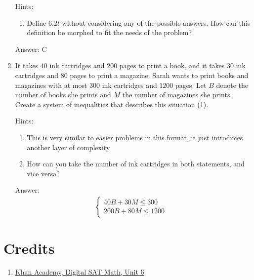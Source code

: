 \documentclass{article}
\begin{document}
\begin{enumerate}
{	      Hints:
	      \begin{enumerate}
		      \item{Define $6.2t$ without considering any of the possible answers. How can this definition be morphed to fit the needs of the problem?}
	      \end{enumerate}

	      Answer: C
	      }

	\item{It takes $40$ ink cartridges and $200$ pages to print a book, and it takes $30$ ink cartridges and $80$ pages to print a magazine. Sarah wants to print books and magazines with at most $300$ ink cartridges and $1200$ pages. Let $B$ denote the number of books she prints and $M$ the number of magazines she prints. Create a system of inequalities that describes this situation (1).

	      Hints:
	      \begin{enumerate}
		      \item{This is very similar to easier problems in this format, it just introduces another layer of complexity}
		      \item{How can you take the number of ink cartridges in both statements, and vice versa?}
	      \end{enumerate}

	      Answer:
	      \[
		      \begin{array}{l}
			      \begin{cases}
				      40B+30M \leq 300 & \\
				      200B+80M \leq 1200
			      \end{cases}
		      \end{array}
	      \]
	      }


\end{enumerate}

\section{Credits}
\begin{enumerate}

	\item{
	      \href{https://www.khanacademy.org/test-prep/v2-sat-math/x0fcc98a58ba3bea7:algebra-medium}{Khan Academy, Digital SAT Math, Unit 6}}

\end{enumerate}
\end{document}
